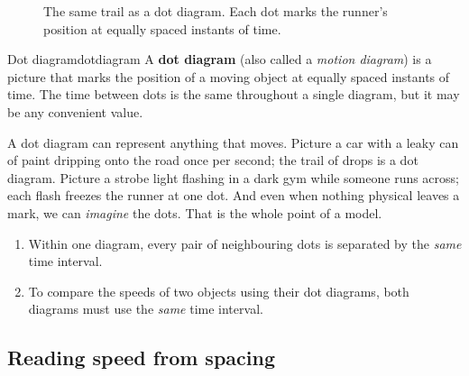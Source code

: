 \documentclass[11pt,twoside,openany]{book}
\begin{document}
\begin{figure}[htb]
\centering
{}
\caption{The same trail as a dot diagram. Each dot marks the runner's position at equally spaced instants of time.}
\label{fig:dotdiagram}
\end{figure}

\begin{definition}{Dot diagram}{dotdiagram}
A \textbf{dot diagram} (also called a \emph{motion diagram}) is a picture that marks the position of a moving object at equally spaced instants of time. The time between dots is the same throughout a single diagram, but it may be any convenient value.
\end{definition}

A dot diagram can represent anything that moves. Picture a car with a leaky can of paint dripping onto the road once per second; the trail of drops is a dot diagram. Picture a strobe light flashing in a dark gym while someone runs across; each flash freezes the runner at one dot. And even when nothing physical leaves a mark, we can \emph{imagine} the dots. That is the whole point of a model.

\begin{keyidea}
\begin{enumerate}[itemsep=2pt]
  \item Within one diagram, every pair of neighbouring dots is separated by the \emph{same} time interval.
  \item To compare the speeds of two objects using their dot diagrams, both diagrams must use the \emph{same} time interval.
\end{enumerate}
\end{keyidea}

\subsection{Reading speed from spacing}
\end{document}
